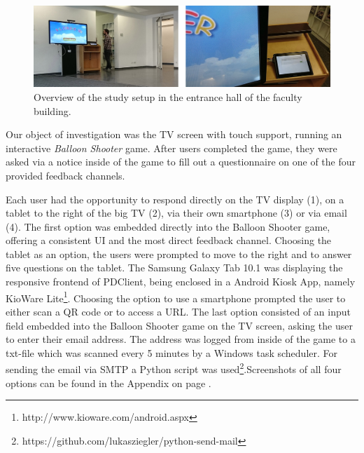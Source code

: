 		\begin{figure}
		    \begin{center}
		        \includegraphics[width=\columnwidth]{img/5_field-study/study-setup.jpg}
		    \end{center}
		 \caption{Overview of the study setup in the entrance hall of the faculty building.}
		 \label{fig:5-study-setup}
		\end{figure}

		Our object of investigation was the TV screen with touch support, running an interactive \textit{Balloon Shooter} game. After users completed the game, they were asked via a notice inside of the game to fill out a questionnaire on one of the four provided feedback channels. 
		

		Each user had the opportunity to respond directly on the TV display (1), on a tablet to the right of the big TV (2), via their own smartphone (3) or via email (4). The first option was embedded directly into the Balloon Shooter game, offering a consistent UI and the most direct feedback channel. Choosing the tablet as an option, the users were prompted to move to the right and to answer five questions on the tablet. The Samsung Galaxy Tab 10.1 was displaying the responsive frontend of PDClient, being enclosed in a Android Kiosk App, namely KioWare Lite\footnote{http://www.kioware.com/android.aspx}. Choosing the option to use a smartphone prompted the user to either scan a QR code or to access a URL. The last option consisted of an input field embedded into the Balloon Shooter game on the TV screen, asking the user to enter their email address. The address was logged from inside of the game to a txt-file which was scanned every 5 minutes by a Windows task scheduler. For sending the email via SMTP a Python script was used\footnote{https://github.com/lukasziegler/python-send-mail}.Screenshots of all four options can be found in the Appendix on page \pageref{appendix:screenshots-balloon-shooter}.



